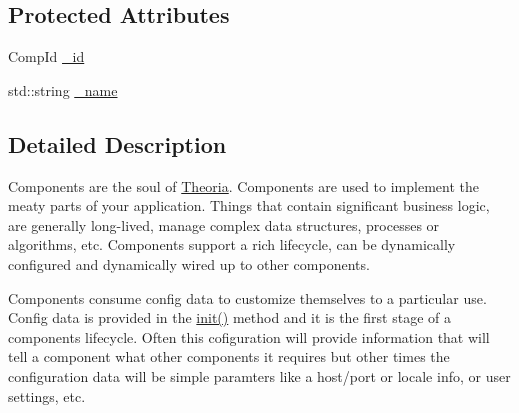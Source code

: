 \subsection*{Protected Attributes}
\begin{DoxyCompactItemize}
\item 
Comp\+Id \hyperlink{classtheoria_1_1core_1_1Component_a460b08de1c87f984fe9b6e4a1b8b50e6}{\+\_\+id}
\item 
std\+::string \hyperlink{classtheoria_1_1core_1_1Component_ac1eca19b044721b873a0ec32cf3667a1}{\+\_\+name}
\end{DoxyCompactItemize}


\subsection{Detailed Description}
Components are the soul of \hyperlink{classtheoria_1_1core_1_1Theoria}{Theoria}. Components are used to implement the meaty parts of your application. Things that contain significant business logic, are generally long-\/lived, manage complex data structures, processes or algorithms, etc. Components support a rich lifecycle, can be dynamically configured and dynamically wired up to other components.

Components consume config data to customize themselves to a particular use. Config data is provided in the \hyperlink{classtheoria_1_1core_1_1Component_a7ed45f6e38442a40666ae4556f794f7d}{init()} method and it is the first stage of a components lifecycle. Often this cofiguration will provide information that will tell a component what other components it requires but other times the configuration data will be simple paramters like a host/port or locale info, or user settings, etc.

